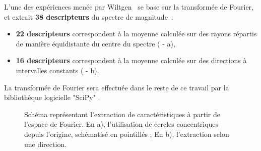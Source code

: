 L'une des expériences menée par Wiltgen~\cite{Wiltgen2008} se base sur la transformée de Fourier, et extrait \textbf{38 descripteurs} du spectre de magnitude~:
\begin{itemize}
    \item \textbf{22 descripteurs} correspondent à la moyenne calculée sur des rayons répartis de manière équidistante du centre du spectre ( - a),
    \item \textbf{16 descripteurs} correspondent à la moyenne calculée sur des directions à intervalles constants ( - b).
\end{itemize}
La transformée de Fourier sera effectuée dans le reste de ce travail par la bibliothèque logicielle "SciPy" \cite{Virtanen2020}.\par

\begin{figure}[h]
    \begin{center}
        \qquad
    \end{center}
    \caption{Schéma représentant l'extraction de caractéristiques à partir de l'espace de Fourier. En a), l'utilisation de cercles concentriques depuis l'origine, schématisé en pointillés ; En b), l'extraction selon une direction.}
    \label{fig:scheme_fourier_features}
\end{figure}\par

